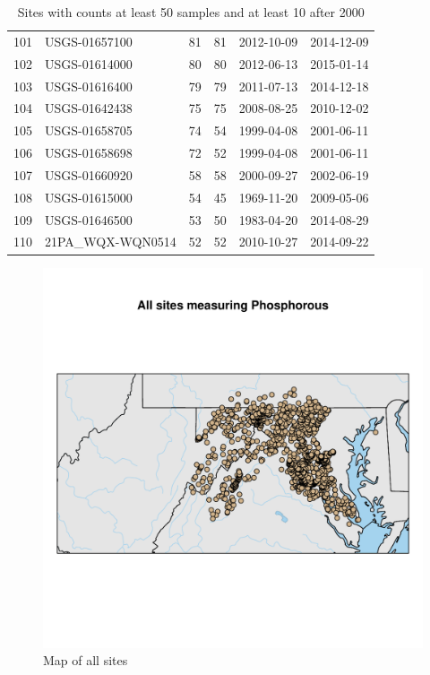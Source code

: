 \documentclass[a4paper,11pt]{article}\usepackage[]{graphicx}\usepackage[]{color}
\makeatletter
\def\maxwidth{ %
  \ifdim\Gin@nat@width>\linewidth
    \linewidth
  \else
    \Gin@nat@width
  \fi
}
\newenvironment{knitrout}{}{} %
\makeatother
\begin{document}
\begin{table}[ht]
\begin{tabular}{rlrrll}
  101 & USGS-01657100 &  81 &  81 & 2012-10-09 & 2014-12-09 \\ 
  102 & USGS-01614000 &  80 &  80 & 2012-06-13 & 2015-01-14 \\ 
  103 & USGS-01616400 &  79 &  79 & 2011-07-13 & 2014-12-18 \\ 
  104 & USGS-01642438 &  75 &  75 & 2008-08-25 & 2010-12-02 \\ 
  105 & USGS-01658705 &  74 &  54 & 1999-04-08 & 2001-06-11 \\ 
  106 & USGS-01658698 &  72 &  52 & 1999-04-08 & 2001-06-11 \\ 
  107 & USGS-01660920 &  58 &  58 & 2000-09-27 & 2002-06-19 \\ 
  108 & USGS-01615000 &  54 &  45 & 1969-11-20 & 2009-05-06 \\ 
  109 & USGS-01646500 &  53 &  50 & 1983-04-20 & 2014-08-29 \\ 
  110 & 21PA\_WQX-WQN0514 &  52 &  52 & 2010-10-27 & 2014-09-22 \\ 
   \hline
\end{tabular}
\caption{Sites with counts at least 50 samples and at least 10 after 2000} 
\label{tab:Summary}
\end{table}




\begin{knitrout}
\color{fgcolor}\begin{figure}
\includegraphics[width=\maxwidth]{figure/plotMap-1} \caption[Map of all sites]{Map of all sites}\label{fig:plotMap}
\end{figure}


\end{knitrout}
\end{document}

